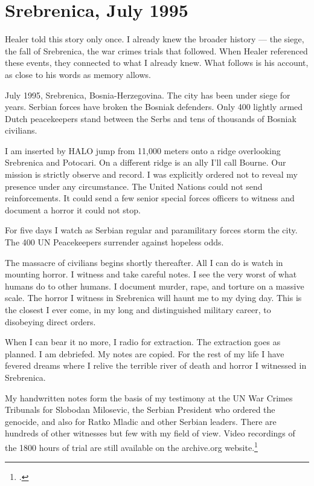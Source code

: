\section*{Srebrenica, July 1995}
\label{pos05:srebrenica-july-1995}

Healer told this story only once. I already knew the broader history --- the siege, the fall of Srebrenica, the war crimes trials that followed. When Healer referenced these events, they connected to what I already knew. What follows is his account, as close to his words as memory allows.

\vspace{0.5cm}

July 1995, Srebrenica, Bosnia-Herzegovina. The city has been under siege for years. Serbian forces have broken the Bosniak defenders. Only 400 lightly armed Dutch peacekeepers stand between the Serbs and tens of thousands of Bosniak civilians.

I am inserted by HALO jump from 11,000 meters onto a ridge overlooking Srebrenica and Potocari. On a different ridge is an ally I'll call Bourne. Our mission is strictly observe and record. I was explicitly ordered not to reveal my presence under any circumstance. The United Nations could not send reinforcements. It could send a few senior special forces officers to witness and document a horror it could not stop.

For five days I watch as Serbian regular and paramilitary forces storm the city. The 400 UN Peacekeepers surrender against hopeless odds.

The massacre of civilians begins shortly thereafter. All I can do is watch in mounting horror. I witness and take careful notes. I see the very worst of what humans do to other humans. I document murder, rape, and torture on a massive scale. The horror I witness in Srebrenica will haunt me to my dying day. This is the closest I ever come, in my long and distinguished military career, to disobeying direct orders.

When I can bear it no more, I radio for extraction. The extraction goes as planned. I am debriefed. My notes are copied. For the rest of my life I have fevered dreams where I relive the terrible river of death and horror I witnessed in Srebrenica.

My handwritten notes form the basis of my testimony at the UN War Crimes Tribunals for Slobodan Milosevic, the Serbian President who ordered the genocide, and also for Ratko Mladic and other Serbian leaders. There are hundreds of other witnesses but few with my field of view. Video recordings of the 1800 hours of trial are still available on the archive.org website.\footcite{milosevicarchive}


